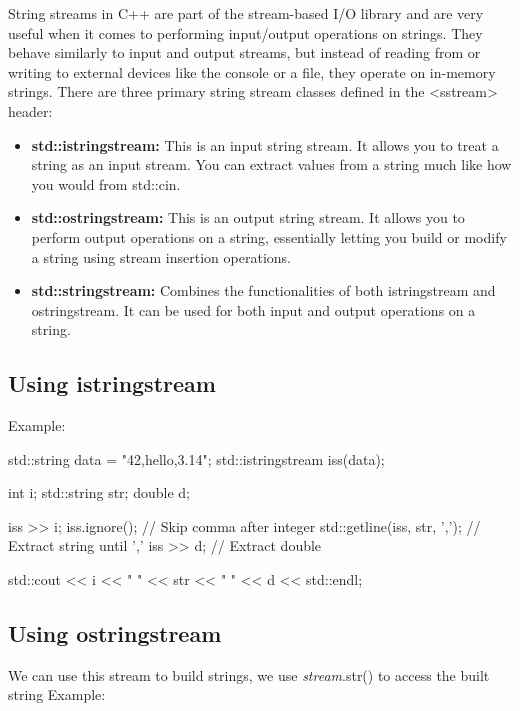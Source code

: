 \documentclass{report}
\begin{document}
        \pagebreak
    \bigbreak \noindent 
     String streams in C++ are part of the stream-based I/O library and are very useful when it comes to performing input/output operations on strings. They behave similarly to input and output streams, but instead of reading from or writing to external devices like the console or a file, they operate on in-memory strings.
     \bigbreak \noindent 
     There are three primary string stream classes defined in the <sstream> header:
     \begin{itemize}
         \item \textbf{std::istringstream:} This is an input string stream. It allows you to treat a string as an input stream. You can extract values from a string much like how you would from std::cin.
         \item \textbf{std::ostringstream:} This is an output string stream. It allows you to perform output operations on a string, essentially letting you build or modify a string using stream insertion operations.
         \item \textbf{std::stringstream:} Combines the functionalities of both istringstream and ostringstream. It can be used for both input and output operations on a string.
     \end{itemize}

     \bigbreak \noindent 
     \subsection{Using istringstream}
     \bigbreak \noindent 
     Example:
     \bigbreak \noindent 
     
     \begin{cppcode}
std::string data = "42,hello,3.14";
std::istringstream iss(data);

int i;
std::string str;
double d;

iss >> i;
iss.ignore(); // Skip comma after integer
std::getline(iss, str, ','); // Extract string until ','
iss >> d;                    // Extract double

std::cout << i << " " << str << " " << d << std::endl;
     \end{cppcode}
     

     \bigbreak \noindent 
     \subsection{Using ostringstream}
     \bigbreak \noindent 
     We can use this stream to build strings, we use \textit{stream}.str() to access the built string
     \bigbreak \noindent 
     Example:
     \bigbreak \noindent 
     
\end{document}
